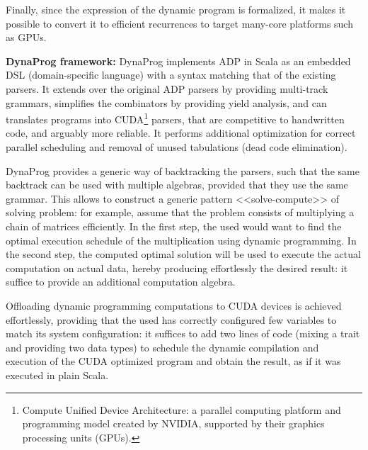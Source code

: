 Finally, since the expression of the dynamic program is formalized, it makes it possible to convert it to efficient recurrences to target many-core platforms such as GPUs.

\textbf{DynaProg framework:} DynaProg implements ADP in Scala as an embedded DSL (domain-specific language) with a syntax matching that of the existing parsers. It extends over the original ADP parsers by providing multi-track grammars, simplifies the combinators by providing yield analysis, and can translates programs into CUDA\footnote{Compute Unified Device Architecture: a parallel computing platform and programming model created by NVIDIA, supported by their graphics processing units (GPUs).} parsers, that are competitive to handwritten code, and arguably more reliable. It performs additional optimization for correct parallel scheduling and removal of unused tabulations (dead code elimination).

DynaProg provides a generic way of backtracking the parsers, such that the same backtrack can be used with multiple algebras, provided that they use the same grammar. This allows to construct a generic pattern <<solve-compute>> of solving problem: for example, assume that the problem consists of multiplying a chain of matrices efficiently. In the first step, the used would want to find the optimal execution schedule of the multiplication using dynamic programming. In the second step, the computed optimal solution will be used to execute the actual computation on actual data, hereby producing effortlessly the desired result: it suffice to provide an additional computation algebra.

Offloading dynamic programming computations to CUDA devices is achieved effortlessly, providing that the used has correctly configured few variables to match its system configuration: it suffices to add two lines of code (mixing a trait and providing two data types) to schedule the dynamic compilation and execution of the CUDA optimized program and obtain the result, as if it was executed in plain Scala.

